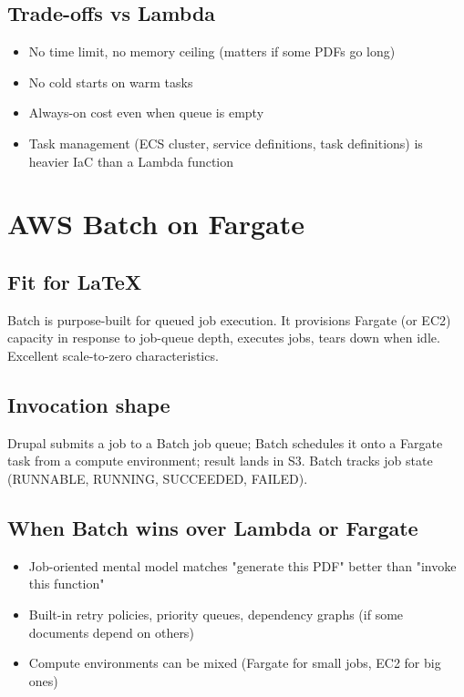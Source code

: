 \documentclass[11pt,letterpaper]{article}
\begin{document}
\subsection{Trade-offs vs Lambda}
\begin{itemize}[nosep]
  \item[+] No time limit, no memory ceiling (matters if some PDFs go long)
  \item[+] No cold starts on warm tasks
  \item[$-$] Always-on cost even when queue is empty
  \item[$-$] Task management (ECS cluster, service definitions, task definitions) is heavier IaC than a Lambda function
\end{itemize}

\newpage
\section{AWS Batch on Fargate}
\label{app:batch}

\subsection{Fit for LaTeX}
Batch is purpose-built for queued job execution. It provisions Fargate (or EC2) capacity in response to job-queue depth, executes jobs, tears down when idle. Excellent scale-to-zero characteristics.

\subsection{Invocation shape}
Drupal submits a job to a Batch job queue; Batch schedules it onto a Fargate task from a compute environment; result lands in S3. Batch tracks job state (RUNNABLE, RUNNING, SUCCEEDED, FAILED).

\subsection{When Batch wins over Lambda or Fargate}
\begin{itemize}[nosep]
  \item Job-oriented mental model matches "generate this PDF" better than "invoke this function"
  \item Built-in retry policies, priority queues, dependency graphs (if some documents depend on others)
  \item Compute environments can be mixed (Fargate for small jobs, EC2 for big ones)
\end{itemize}
\end{document}
